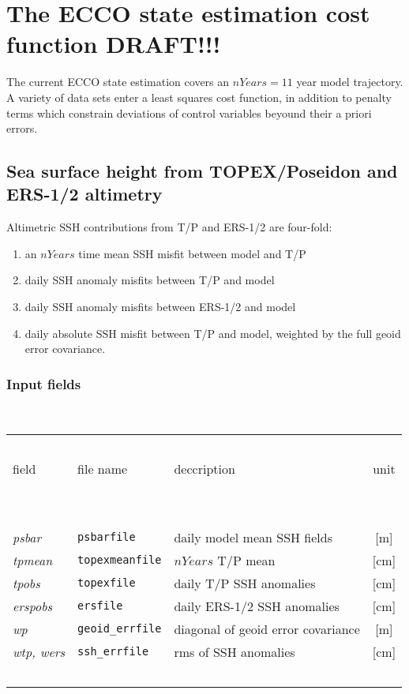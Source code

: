 \section{The ECCO state estimation cost function DRAFT!!!
\label{sectioneccocost}}

The current ECCO state estimation covers an $nYears = 11$ year
model trajectory.
A variety of data sets enter a least squares cost function,
in addition to penalty terms which constrain deviations
of control variables beyound their a priori errors.

\subsection{Sea surface height from TOPEX/Poseidon and ERS-1/2 altimetry}

Altimetric SSH contributions from T/P and ERS-1/2 are four-fold:
%
\begin{enumerate}
%
\item 
an $nYears$ time mean SSH misfit between
model and T/P
%
\item
daily SSH anomaly misfits between T/P and model
%
\item
daily SSH anomaly misfits between ERS-1/2 and model
%
\item
daily absolute SSH misfit between T/P and model,
weighted by the full geoid error covariance.
%
\end{enumerate}

\subsubsection{Input fields}
~

\begin{table}[h!]
\begin{center}
\begin{tabular}{lllc}
\hline \hline
~&~&~&~\\
field & file name & deccription & unit \\
~&~&~&~\\
\hline
~&~&~&~\\
{\it psbar} & {\tt psbarfile} & daily model mean SSH fields & [m] \\
{\it tpmean} & {\tt topexmeanfile} & $nYears$ T/P mean & [cm] \\
{\it tpobs}  & {\tt topexfile} & daily T/P SSH anomalies & [cm] \\
{\it erspobs}  & {\tt ersfile} & daily ERS-1/2 SSH anomalies & [cm] \\
{\it wp} & {\tt geoid\_errfile} & diagonal of geoid error covariance & [m] \\
{\it wtp, wers} & {\tt ssh\_errfile} & rms of SSH anomalies & [cm] \\
~&~&~&~\\
\hline \hline
\end{tabular}
\end{center}
\end{table}


